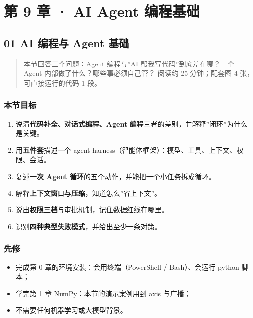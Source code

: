 \chapter{第 9 章 · AI Agent
编程基础}\label{ux7b2c-9-ux7ae0-ai-agent-ux7f16ux7a0bux57faux7840}

\section{01 AI 编程与 Agent
基础}\label{ai-ux7f16ux7a0bux4e0e-agent-ux57faux7840}

\begin{quote}
本节回答三个问题：Agent 编程与''AI 帮我写代码''到底差在哪？一个 Agent
内部做了什么？哪些事必须自己管？ 阅读约 25 分钟；配套图 4
张，可直接运行的代码 1 段。
\end{quote}

\subsection{本节目标}\label{ux672cux8282ux76eeux6807-31}

\begin{enumerate}
\def\labelenumi{\arabic{enumi}.}
\tightlist
\item
  说清\textbf{代码补全、对话式编程、Agent
  编程}三者的差别，并解释''闭环''为什么是关键。
\item
  用\textbf{五件套}描述一个 agent
  harness（智能体框架）：模型、工具、上下文、权限、会话。
\item
  复述\textbf{一次 Agent 循环}的五个动作，并能把一个小任务拆成循环。
\item
  解释\textbf{上下文窗口与压缩}，知道怎么''省上下文''。
\item
  说出\textbf{权限三档}与审批机制，记住数据红线在哪里。
\item
  识别\textbf{四种典型失败模式}，并给出至少一条对策。
\end{enumerate}

\subsection{先修}\label{ux5148ux4fee-24}

\begin{itemize}
\tightlist
\item
  完成第 0 章的环境安装：会用终端（PowerShell / Bash）、会运行 python
  脚本；
\item
  学完第 1 章 NumPy：本节的演示案例用到 axis 与广播；
\item
  不需要任何机器学习或大模型背景。
\end{itemize}

